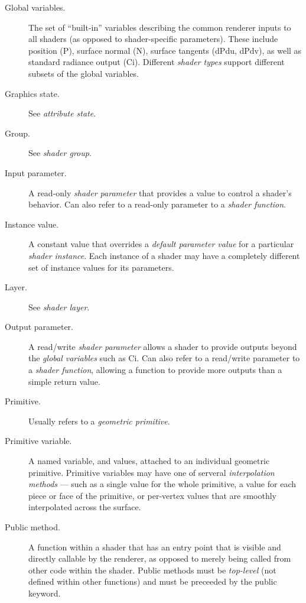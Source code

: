 \documentclass[11pt,letterpaper]{book}
\def\Ci{{\cf Ci}\xspace}
\def\N{{\cf N}\xspace}
\def\P{{\cf P}\xspace}
\def\dPdu{{\cf dPdu}\xspace}
\def\dPdv{{\cf dPdv}\xspace}
\begin{document}
\begin{appendix}
\begin{description}
\item[Global variables.] The set of ``built-in'' variables describing the
  common renderer inputs to all shaders (as opposed to shader-specific
  parameters).  These include position (\P), surface normal (\N),
  surface tangents (\dPdu, \dPdv), as well as standard radiance output (\Ci).
  Different \emph{shader types} support
  different subsets of the global variables.

\item[Graphics state.] See \emph{attribute state}.

\item[Group.] See \emph{shader group}.

\item[Input parameter.] A read-only \emph{shader parameter} that provides
  a value to control a shader's behavior.  Can also refer to a read-only
  parameter to a \emph{shader function}.

\item[Instance value.] A constant value that overrides a \emph{default
  parameter value} for a particular \emph{shader instance}.  Each
  instance of a shader may have a completely different set of instance
  values for its parameters.

\item[Layer.] See \emph{shader layer}.

\item[Output parameter.] A read/write \emph{shader parameter} allows a
  shader to provide outputs beyond the \emph{global variables} such as
  \Ci.  Can also refer to a read/write parameter to a
  \emph{shader function}, allowing a function to provide more outputs
  than a simple return value.

\item[Primitive.] Usually refers to a \emph{geometric primitive}.

\item[Primitive variable.] A named variable, and values, attached to an
  individual geometric primitive.  Primitive variables may have one of
  serveral \emph{interpolation methods} --- such as a single value for
  the whole primitive, a value for each piece or face of the primitive,
  or per-vertex values that are smoothly interpolated across the
  surface.

\item[Public method.] A function within a shader that has an entry point
  that is visible and directly callable by the renderer, as opposed to
  merely being called from other code within the shader.  Public methods
  must be \emph{top-level} (not defined within other functions) and must
  be preceeded by the {\cf public} keyword.


\end{description}
\end{appendix}
\end{document}
